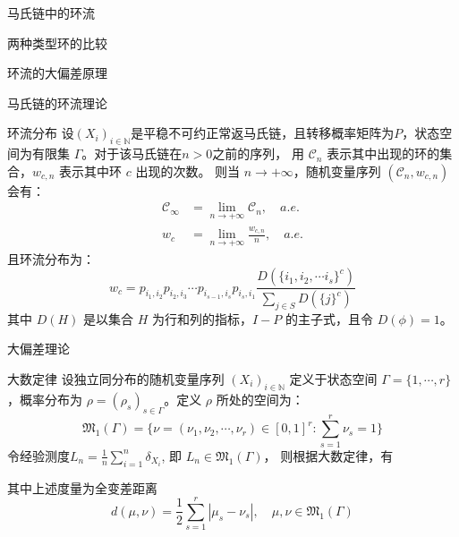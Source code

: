\documentclass{beamer}
\begin{document}
	\begin{frame}{马氏链中的环流}
		\begin{block}{两种类型环的比较}

			
		\end{block}
		
	\end{frame}

	\begin{frame}{环流的大偏差原理}
		
	\end{frame}


















	\begin{frame}{马氏链的环流理论}
		\begin{block}{环流分布}
			设$(\mathit{X}_i)_{i\in \mathbb{N}}$是平稳不可约正常返马氏链，且转移概率矩阵为$\mathit{P}$，状态空间为有限集 $\Gamma$。对于该马氏链在$n>0$之前的序列，
			用 $\mathcal{C}_n$ 表示其中出现的环的集合，$\mathit{w}_{c,n}$ 表示其中环 $c$ 出现的次数。
			则当 $n \rightarrow +\infty$，随机变量序列 $(\mathcal{C}_n, \mathit{w}_{c, n})$会有：
			\begin{align*}
				\mathcal{C}_{\infty} &= \lim_{n \rightarrow +\infty} \mathcal{C}_n, \quad a.e. \\
				\mathit{w}_c &= \lim_{n \rightarrow +\infty} \frac{\mathit{w}_{c,n}}{n}, \quad a.e. 
			\end{align*}
			且环流分布为：
			$$
			\mathit{w}_c = \mathit{p}_{i_1, i_2} \mathit{p}_{i_2, i_3} \cdots \mathit{p}_{i_{s-1}, i_{s}} \mathit{p}_{i_s, i_1} \frac{\mathit{D}(\{i_1, i_2, \cdots i_s\}^c)}{\sum_{j\in \mathit{S}} \mathit{D}(\{j\}^c)}
			$$
			其中 $\mathit{D}(H)$ 是以集合 $H$ 为行和列的指标，$I-P$ 的主子式，且令 $\mathit{D}(\phi) = 1$。
		\end{block}
	\end{frame}

	\begin{frame}{大偏差理论}
		\begin{block}{大数定律}
			设独立同分布的随机变量序列 $\left(\mathit{X}_i \right)_{i\in \mathbb{N}}$ 定义于状态空间 $\Gamma=\{1, \cdots, r\}$，概率分布为 $\rho=(\rho_s)_{s \in \Gamma}$。定义 $\rho$ 所处的空间为：
			$$ 
			\mathfrak{M}_1(\Gamma) = \{\nu = (\nu_1, \nu_2, \cdots, \nu_r)\in [0,1]^r:\sum_{s=1}^r \nu_s = 1\}
			$$ 
			令经验测度$\mathit{L}_n = \frac{1}{n}\sum_{i=1}^{n}\delta_{\mathit{X}_i} $, 即 $\mathit{L}_n \in \mathfrak{M}_1(\Gamma)$，
			则根据大数定律，有
			\begin{figure}
				\centering
			\end{figure}
			其中上述度量为全变差距离
			$$
			d(\mu, \nu) = \frac{1}{2} \sum_{s=1}^r |\mu_s - \nu_s|, \quad \mu, \nu \in \mathfrak{M}_1(\Gamma)
			$$
		\end{block}
	\end{frame}
\end{document}
